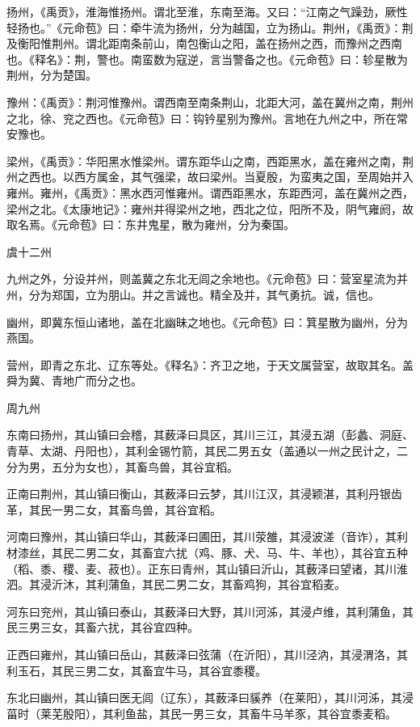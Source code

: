 \documentclass[a4paper,12pt,UTF8,twoside]{ctexbook}
\begin{document}
	扬州，《禹贡》，淮海惟扬州。谓北至淮，东南至海。又曰：“江南之气躁劲，厥性轻扬也。”《元命苞》曰：牵牛流为扬州，分为越国，立为扬山。荆州，《禹贡》：荆及衡阳惟荆州。谓北距南条前山，南包衡山之阳，盖在扬州之西，而豫州之西南也。《释名》：荆，警也。南蛮数为寇逆，言当警备之也。《元命苞》曰：轸星散为荆州，分为楚国。
	
	豫州：《禹贡》：荆河惟豫州。谓西南至南条荆山，北距大河，盖在冀州之南，荆州之北，徐、兖之西也。《元命苞》曰：钩钤星别为豫州。言地在九州之中，所在常安豫也。
	
	梁州，《禹贡》：华阳黑水惟梁州。谓东距华山之南，西距黑水，盖在雍州之南，荆州之西也。以西方属金，其气强梁，故曰梁州。当夏殷，为蛮夷之国，至周始并入雍州。雍州，《禹贡》：黑水西河惟雍州。谓西距黑水，东距西河，盖在冀州之西，梁州之北。《太康地记》：雍州并得梁州之地，西北之位，阳所不及，阴气雍阏，故取名焉。《元命苞》曰：东井鬼星，散为雍州，分为秦国。
	
	虞十二州
	
	九州之外，分设并州，则盖冀之东北无闾之余地也。《元命苞》曰：营室星流为并州，分为郑国，立为朋山。并之言诚也。精全及并，其气勇抗。诚，信也。
	
	幽州，即冀东恒山诸地，盖在北幽昧之地也。《元命苞》曰：箕星散为幽州，分为燕国。
	
	营州，即青之东北、辽东等处。《释名》：齐卫之地，于天文属营室，故取其名。盖舜为冀、青地广而分之也。
	
	周九州
	
	东南曰扬州，其山镇曰会稽，其薮泽曰具区，其川三江，其浸五湖（彭蠡、洞庭、青草、太湖、丹阳也），其利金锡竹箭，其民二男五女（盖通以一州之民计之，二分为男，五分为女也），其畜鸟兽，其谷宜稻。
	
	正南曰荆州，其山镇曰衡山，其薮泽曰云梦，其川江汉，其浸颖湛，其利丹银齿革，其民一男二女，其畜鸟兽，其谷宜稻。
	
	河南曰豫州，其山镇曰华山，其薮泽曰圃田，其川荥雒，其浸波溠（音诈），其利材漆丝，其民二男二女，其畜宜六扰（鸡、豚、犬、马、牛、羊也），其谷宜五种（稻、黍、稷、麦、菽也）。正东曰青州，其山镇曰沂山，其薮泽曰望诸，其川淮泗。其浸沂沐，其利蒲鱼，其民二男二女，其畜鸡狗，其谷宜稻麦。
	
	河东曰兖州，其山镇曰泰山，其薮泽曰大野，其川河泲，其浸卢维，其利蒲鱼，其民三男三女，其畜六扰，其谷宜四种。
	
	正西曰雍州，其山镇曰岳山，其薮泽曰弦蒲（在沂阳），其川泾汭，其浸渭洛，其利玉石，其民三男二女，其畜宜牛马，其谷宜黍稷。
	
	东北曰幽州，其山镇曰医无闾（辽东），其薮泽曰貕养（在莱阳），其川河泲，其浸菑时（莱芜殷阳），其利鱼盐，其民一男三女，其畜牛马羊豕，其谷宜黍麦稻。
	
\end{document}
